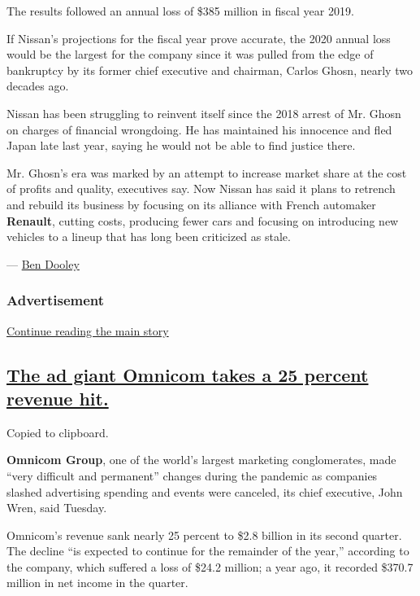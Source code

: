 The results followed an annual loss of \$385 million in fiscal year
2019.

If Nissan's projections for the fiscal year prove accurate, the 2020
annual loss would be the largest for the company since it was pulled
from the edge of bankruptcy by its former chief executive and chairman,
Carlos Ghosn, nearly two decades ago.

Nissan has been struggling to reinvent itself since the 2018 arrest of
Mr. Ghosn on charges of financial wrongdoing. He has maintained his
innocence and fled Japan late last year, saying he would not be able to
find justice there.

Mr. Ghosn's era was marked by an attempt to increase market share at the
cost of profits and quality, executives say. Now Nissan has said it
plans to retrench and rebuild its business by focusing on its alliance
with French automaker \textbf{Renault}, cutting costs, producing fewer
cars and focusing on introducing new vehicles to a lineup that has long
been criticized as stale.

--- \href{https://www.nytimes.com/by/ben-dooley}{Ben Dooley}

\hypertarget{advertisement-2}{%
\subsubsection{Advertisement}\label{advertisement-2}}

\protect\hyperlink{after-dfp-ad-mid3}{Continue reading the main story}

\hypertarget{the-ad-giant-omnicom-takes-a-25-percent-revenue-hit}{%
\subsection{\texorpdfstring{\protect\hyperlink{the-ad-giant-omnicom-takes-a-25-percent-revenue-hit}{The
ad giant Omnicom takes a 25 percent revenue
hit.}}{The ad giant Omnicom takes a 25 percent revenue hit.}}\label{the-ad-giant-omnicom-takes-a-25-percent-revenue-hit}}

Copied to clipboard.

\textbf{Omnicom Group}, one of the world's largest marketing
conglomerates, made ``very difficult and permanent'' changes during the
pandemic as companies slashed advertising spending and events were
canceled, its chief executive, John Wren, said Tuesday.

Omnicom's revenue sank nearly 25 percent to \$2.8 billion in its second
quarter. The decline ``is expected to continue for the remainder of the
year,'' according to the company, which suffered a loss of \$24.2
million; a year ago, it recorded \$370.7 million in net income in the
quarter.

